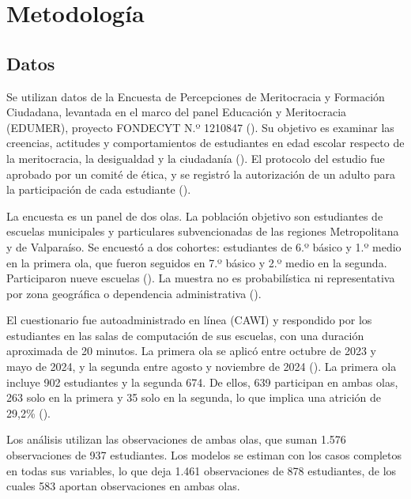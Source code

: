 \documentclass[
  spanish,
  a4paper,
  oneside]{scrbook}
\begin{document}

\chapter{Metodología}\label{metodologuxeda}

\section{Datos}\label{datos}

Se utilizan datos de la Encuesta de Percepciones de Meritocracia y
Formación Ciudadana, levantada en el marco del panel Educación y
Meritocracia (EDUMER), proyecto FONDECYT N.º 1210847
().
Su objetivo es examinar las creencias, actitudes y comportamientos de
estudiantes en edad escolar respecto de la meritocracia, la desigualdad
y la ciudadanía ().
El protocolo del estudio fue aprobado por un comité de ética, y se
registró la autorización de un adulto para la participación de cada
estudiante ().

La encuesta es un panel de dos olas. La población objetivo son
estudiantes de escuelas municipales y particulares subvencionadas de las
regiones Metropolitana y de Valparaíso. Se encuestó a dos cohortes:
estudiantes de 6.º básico y 1.º medio en la primera ola, que fueron
seguidos en 7.º básico y 2.º medio en la segunda. Participaron nueve
escuelas (). La
muestra no es probabilística ni representativa por zona geográfica o
dependencia administrativa ().

El cuestionario fue autoadministrado en línea (CAWI) y respondido por
los estudiantes en las salas de computación de sus escuelas, con una
duración aproximada de 20 minutos. La primera ola se aplicó entre
octubre de 2023 y mayo de 2024, y la segunda entre agosto y noviembre de
2024 (). La primera ola incluye 902 estudiantes y la segunda 674. De
ellos, 639 participan en ambas olas, 263 solo en la primera y 35 solo en
la segunda, lo que implica una atrición de 29,2\%
().

Los análisis utilizan las observaciones de ambas olas, que suman 1.576
observaciones de 937 estudiantes. Los modelos se estiman con los casos
completos en todas sus variables, lo que deja 1.461 observaciones de 878
estudiantes, de los cuales 583 aportan observaciones en ambas olas.
\end{document}
